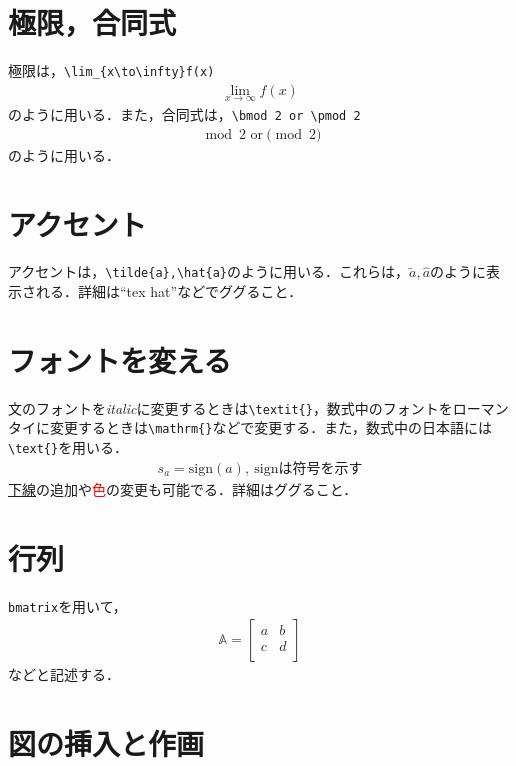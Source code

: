 \documentclass[11pt,a4paper]{jsarticle}
\begin{document}
\section{極限，合同式}

極限は，\verb|\lim_{x\to\infty}f(x)|
\begin{align*}
  \lim_{x\to\infty}f(x)
\end{align*}
のように用いる．また，合同式は，\verb|\bmod 2 or \pmod 2|
\begin{align*}
  \bmod 2 \text{~or} \pmod 2
\end{align*}
のように用いる．

\section{アクセント}

アクセントは，\verb|\tilde{a},\hat{a}|のように用いる．これらは，$\tilde{a},\hat{a}$のように表示される．詳細は``tex hat''などでググること．

\section{フォントを変える}

文のフォントを\textit{italic}に変更するときは\verb|\textit{}|，数式中のフォントをローマンタイに変更するときは\verb|\mathrm{}|などで変更する．また，数式中の日本語には\verb|\text{}|を用いる．
\begin{align*}
  s_a = \mathrm{sign}(a),~\text{signは符号を示す}
\end{align*}
\underline{下線}の追加や\textcolor{red}{色}の変更も可能でる．詳細はググること．

\section{行列}

\verb|bmatrix|を用いて，
\begin{align*}
  \mathbb{A}=
  \begin{bmatrix}
    a & b \\
    c & d \\
  \end{bmatrix}
\end{align*}
などと記述する．

\section{図の挿入と作画}
\end{document}
